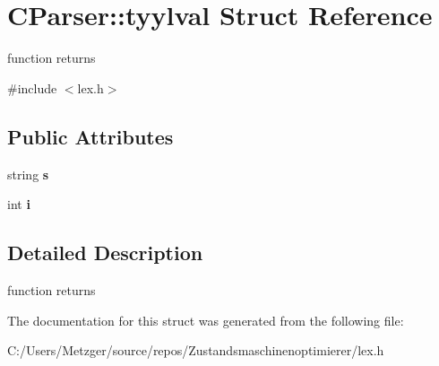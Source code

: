 \hypertarget{struct_c_parser_1_1tyylval}{}\section{C\+Parser\+:\+:tyylval Struct Reference}
\label{struct_c_parser_1_1tyylval}


function returns  




{\ttfamily \#include $<$lex.\+h$>$}

\subsection*{Public Attributes}
\begin{DoxyCompactItemize}
\item 
\mbox{\label{struct_c_parser_1_1tyylval_a52b131df1ea6f074c860b3c1235bb7b1}} 
string {\bfseries s}
\item 
\mbox{\label{struct_c_parser_1_1tyylval_a672dfa344658441aa4eb37eb078b7a6a}} 
int {\bfseries i}
\end{DoxyCompactItemize}


\subsection{Detailed Description}
function returns 



The documentation for this struct was generated from the following file\+:\begin{DoxyCompactItemize}
\item 
C\+:/\+Users/\+Metzger/source/repos/\+Zustandsmaschinenoptimierer/lex.\+h\end{DoxyCompactItemize}
